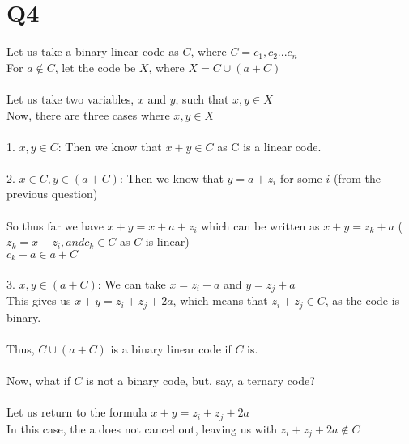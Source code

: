 \documentclass{article}
\begin{document}
\section{Q4}
Let us take a binary linear code as $C$, where $C = {c_1,c_2...c_n}$\\
For $a \notin C$, let the code be $X$, where $X = C \cup (a+C)$\\\\
Let us take two variables, $x$ and $y$, such that $x,y \in X$\\
Now, there are three cases where $x,y \in X$\\
\\
1. $x,y \in C$: Then we know that $x+y \in C$ as C is a linear code.\\\\
2. $x \in C, y \in (a+C)$: Then we know that $y = a + z_i$ for some $i$ (from the previous question)\\\\
So thus far we have $x + y = x + a + z_i$ which can be written as $x + y = z_k + a$ ($z_k = x + z_i, and c_k \in C$ as $C$ is linear)\\
$c_k + a \in a + C$\\\\
3. $x,y \in (a+C)$: We can take $x = z_i +a$ and $y = z_j + a$\\
This gives us $x + y = z_i + z_j + 2a$, which means that $z_i + z_j \in C$, as the code is binary.\\\\
Thus, $C \cup (a+C)$ is a binary linear code if $C$ is.\\\\
Now, what if $C$ is not a binary code, but, say, a ternary code?\\\\
Let us return to the formula $x + y = z_i + z_j + 2a$\\
In this case, the a does not cancel out, leaving us with $z_i + z_j + 2a \notin C$
\end{document}
